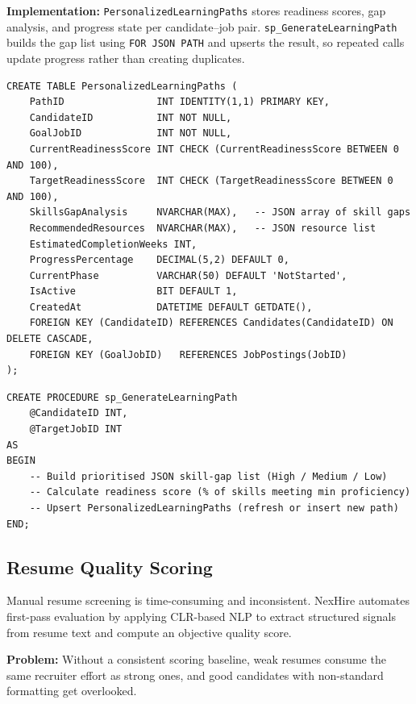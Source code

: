 \documentclass[11pt,a4paper]{article}
\begin{document}
\textbf{Implementation:} \texttt{PersonalizedLearningPaths} stores readiness scores, gap analysis, and progress state per candidate--job pair. \texttt{sp\_GenerateLearningPath} builds the gap list using \texttt{FOR JSON PATH} and upserts the result, so repeated calls update progress rather than creating duplicates.

\begin{verbatim}
CREATE TABLE PersonalizedLearningPaths (
    PathID                INT IDENTITY(1,1) PRIMARY KEY,
    CandidateID           INT NOT NULL,
    GoalJobID             INT NOT NULL,
    CurrentReadinessScore INT CHECK (CurrentReadinessScore BETWEEN 0 AND 100),
    TargetReadinessScore  INT CHECK (TargetReadinessScore BETWEEN 0 AND 100),
    SkillsGapAnalysis     NVARCHAR(MAX),   -- JSON array of skill gaps
    RecommendedResources  NVARCHAR(MAX),   -- JSON resource list
    EstimatedCompletionWeeks INT,
    ProgressPercentage    DECIMAL(5,2) DEFAULT 0,
    CurrentPhase          VARCHAR(50) DEFAULT 'NotStarted',
    IsActive              BIT DEFAULT 1,
    CreatedAt             DATETIME DEFAULT GETDATE(),
    FOREIGN KEY (CandidateID) REFERENCES Candidates(CandidateID) ON DELETE CASCADE,
    FOREIGN KEY (GoalJobID)   REFERENCES JobPostings(JobID)
);
\end{verbatim}

\begin{verbatim}
CREATE PROCEDURE sp_GenerateLearningPath
    @CandidateID INT,
    @TargetJobID INT
AS
BEGIN
    -- Build prioritised JSON skill-gap list (High / Medium / Low)
    -- Calculate readiness score (% of skills meeting min proficiency)
    -- Upsert PersonalizedLearningPaths (refresh or insert new path)
END;
\end{verbatim}

\subsection{Resume Quality Scoring}

\noindent
Manual resume screening is time-consuming and inconsistent. NexHire automates first-pass evaluation by applying CLR-based NLP to extract structured signals from resume text and compute an objective quality score.

\textbf{Problem:} Without a consistent scoring baseline, weak resumes consume the same recruiter effort as strong ones, and good candidates with non-standard formatting get overlooked.
\end{document}

